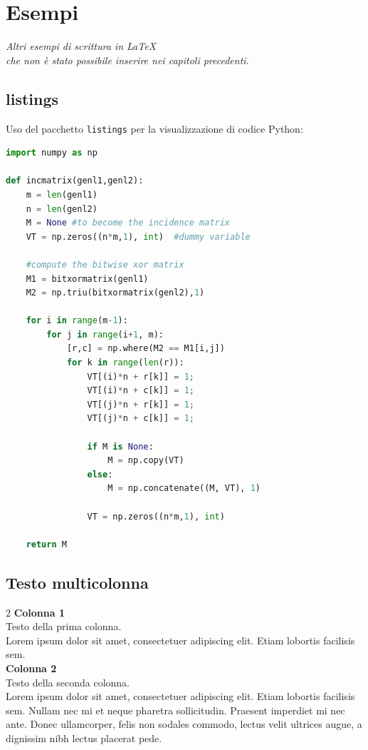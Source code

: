 \documentclass[envcountsame,envcountchap]{styles/svmono}
\begin{document}
\chapter{Esempi}  \label{Cap.3}

\vspace{2cm}

\begin{flushright}
 \textit{Altri esempi di scrittura in \LaTeX\\ che non è stato possibile inserire nei capitoli precedenti.}
\end{flushright}

\vspace{0.5cm}

\section{listings}
Uso del pacchetto {\tt listings} per la visualizzazione di codice Python:
\begin{lstlisting}[language=Python]
import numpy as np
    
def incmatrix(genl1,genl2):
    m = len(genl1)
    n = len(genl2)
    M = None #to become the incidence matrix
    VT = np.zeros((n*m,1), int)  #dummy variable
    
    #compute the bitwise xor matrix
    M1 = bitxormatrix(genl1)
    M2 = np.triu(bitxormatrix(genl2),1) 

    for i in range(m-1):
        for j in range(i+1, m):
            [r,c] = np.where(M2 == M1[i,j])
            for k in range(len(r)):
                VT[(i)*n + r[k]] = 1;
                VT[(i)*n + c[k]] = 1;
                VT[(j)*n + r[k]] = 1;
                VT[(j)*n + c[k]] = 1;
                
                if M is None:
                    M = np.copy(VT)
                else:
                    M = np.concatenate((M, VT), 1)
                
                VT = np.zeros((n*m,1), int)
    
    return M
\end{lstlisting}


\section{Testo multicolonna}

\begin{multicols}{2}
    \textbf{Colonna 1}\\
    Testo della prima colonna.\\
    Lorem ipsum dolor sit amet, consectetuer adipiscing elit. Etiam lobortis facilisis sem.
    \columnbreak\\
    \textbf{Colonna 2}\\
    Testo della seconda colonna.\\
    Lorem ipsum dolor sit amet, consectetuer adipiscing elit. Etiam lobortis facilisis sem. Nullam nec mi et neque pharetra sollicitudin. Praesent imperdiet mi nec ante. Donec ullamcorper, felis non sodales commodo, lectus velit ultrices augue, a dignissim nibh lectus placerat pede.
\end{multicols}
\end{document}
